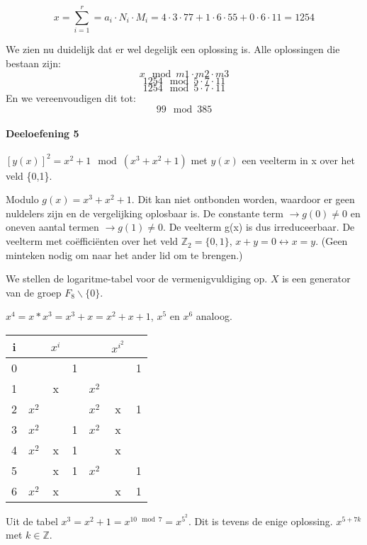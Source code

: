 \documentclass[12pt]{article}
\begin{document}
    \begin{equation}
        x = \sum_{i=1}^{r} = a_i \cdot N_i \cdot M_i = 4 \cdot 3 \cdot 77 + 1 \cdot 6 \cdot 55 + 0 \cdot 6 \cdot 11 = 1254
    \end{equation}
    
    We zien nu duidelijk dat er wel degelijk een oplossing is.
    Alle oplossingen die bestaan zijn:
    \begin{equation}
        x \mod m1 \cdot m2 \cdot m3        
    \end{equation}
    \begin{equation}
        1254 \mod 5 \cdot 7 \cdot 11
    \end{equation}
    \begin{equation}
        1254 \mod 5 \cdot 7 \cdot 11
    \end{equation}
    En we vereenvoudigen dit tot:
    \begin{equation}
        99 \mod 385
    \end{equation}
    
    
    \paragraph{Deeloefening 5}
    
	$ [y(x)]^2 = x^2 +1 \mod(x^3 + x^2 +1)$ met $y(x)$ een veelterm in x over het veld \{0,1\}.

	Modulo $g(x) = x^3 + x^2 +1$. Dit kan niet ontbonden worden, waardoor er geen nuldelers zijn en de vergelijking oplosbaar is. De constante term  $\rightarrow g(0) \neq 0 $ en oneven aantal termen $\rightarrow g(1) \neq 0  $. De veelterm g(x) is dus irreduceerbaar. De veelterm met co\"effici\"enten over het veld $\mathbb{Z}_{2}= \{0,1\}$, $x+y=0 \leftrightarrow x=y $. (Geen minteken nodig om naar het ander lid om te brengen.) 

	We stellen de logaritme-tabel voor de vermenigvuldiging op. $X$ is een generator van de groep $F_8 \backslash \{0\}$.

	$x^4 = x * x^3 = x^3 + x = x^2 + x +1$, $x^5$ en $x^6$ analoog.

	\begin{table}[H]
	\centering
	\begin{tabular}{|c | c | c | c || c | c | c|}
	\hline
	\bf{i}    &       & \bf{$x^i$} &    &       &  \bf{$x^{i^2}$} &  \\ 
	\hline
	0    &       &      & 1   &       &       & 1  \\ 
	1    &       & x    &     & $x^2$ &       &    \\
	2    & $x^2$ &      &     & $x^2$ & x     & 1  \\
	3    & $x^2$ &      & 1   & $x^2$ & x     &    \\
	4    & $x^2$ & x    & 1   &       & x     &    \\
	5    &       & x    & 1   & $x^2$ &       & 1  \\
	6    & $x^2$ & x    &     &       & x     & 1 \\
	\hline
	\end{tabular}
	\end{table}

	Uit de tabel $x^3 = x^2 +1 = x^{10 \mod 7}=x^{5^2}$. Dit is tevens de enige oplossing. 
	$x^{5+7k}$ met $k \in \mathbb{Z}$.
\end{document}
